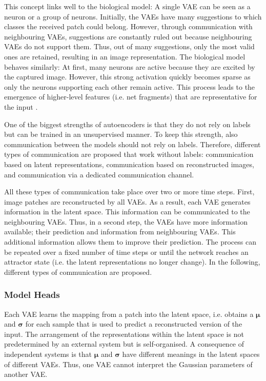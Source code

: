 This concept links well to the biological model: A single VAE can be seen as a neuron or a group of neurons. Initially, the VAEs have many suggestions to which classes the received patch could belong. However, through communication with neighbouring VAEs, suggestions are constantly ruled out because neighbouring VAEs do not support them. Thus, out of many suggestions, only the most valid ones are retained, resulting in an image representation. The biological model behaves similarly: At first, many neurons are active because they are excited by the captured image. However, this strong activation quickly becomes sparse as only the neurons supporting each other remain active. This process leads to the emergence of higher-level features (i.e. net fragments) that are representative for the input .

One of the biggest strengths of autoencoders is that they do not rely on labels but can be trained in an unsupervised manner. To keep this strength, also communication between the models should not rely on labels. Therefore, different types of communication are proposed that work without labels: communication based on latent representations, communication based on reconstructed images, and communication via a dedicated communication channel.

All these types of communication take place over two or more time steps. First, image patches are reconstructed by all VAEs. As a result, each VAE generates information in the latent space. This information can be communicated to the neighbouring VAEs. Thus, in a second step, the VAEs have more information available; their prediction and information from neighbouring VAEs. This additional information allows them to improve their prediction. The process can be repeated over a fixed number of time steps or until the network reaches an attractor state (i.e. the latent representations no longer change). In the following, different types of communication are proposed.


\subsubsection{Model Heads}
Each VAE learns the mapping from a patch into the latent space, i.e. obtains a $\boldsymbol{\mu}$ and $\boldsymbol{\sigma}$ for each sample that is used to predict a reconstructed version of the input.
The arrangement of the representations within the latent space is not predetermined by an external system but is self-organised. A consequence of independent systems is that $\boldsymbol{\mu}$ and $\boldsymbol{\sigma}$ have different meanings in the latent spaces of different VAEs. Thus, one VAE cannot interpret the Gaussian parameters of another VAE.

